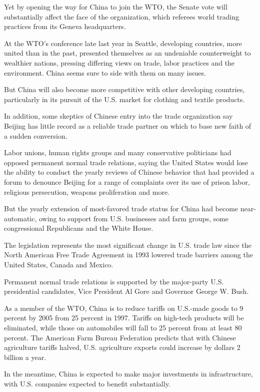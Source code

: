 Yet by opening the way for China to join the WTO, the Senate vote will
substantially affect the face of the organization, which referees world
trading practices from its Geneva headquarters.

At the WTO's conference late last year in Seattle, developing countries,
more united than in the past, presented themselves as an undeniable
counterweight to wealthier nations, pressing differing views on trade,
labor practices and the environment. China seems sure to side with them
on many issues.

But China will also become more competitive with other developing
countries, particularly in its pursuit of the U.S. market for clothing
and textile products.

In addition, some skeptics of Chinese entry into the trade organization
say Beijing has little record as a reliable trade partner on which to
base new faith of a sudden conversion.

Labor unions, human rights groups and many conservative politicians had
opposed permanent normal trade relations, saying the United States would
lose the ability to conduct the yearly reviews of Chinese behavior that
had provided a forum to denounce Beijing for a range of complaints over
its use of prison labor, religious persecution, weapons proliferation
and more.

But the yearly extension of most-favored trade status for China had
become near-automatic, owing to support from U.S. businesses and farm
groups, some congressional Republicans and the White House.

The legislation represents the most significant change in U.S. trade law
since the North American Free Trade Agreement in 1993 lowered trade
barriers among the United States, Canada and Mexico.

Permanent normal trade relations is supported by the major-party U.S.
presidential candidates, Vice President Al Gore and Governor George W.
Bush.

As a member of the WTO, China is to reduce tariffs on U.S.-made goods to
9 percent by 2005 from 25 percent in 1997. Tariffs on high-tech products
will be eliminated, while those on automobiles will fall to 25 percent
from at least 80 percent. The American Farm Bureau Federation predicts
that with Chinese agriculture tariffs halved, U.S. agriculture exports
could increase by dollars 2 billion a year.

In the meantime, China is expected to make major investments in
infrastructure, with U.S. companies expected to benefit substantially.

